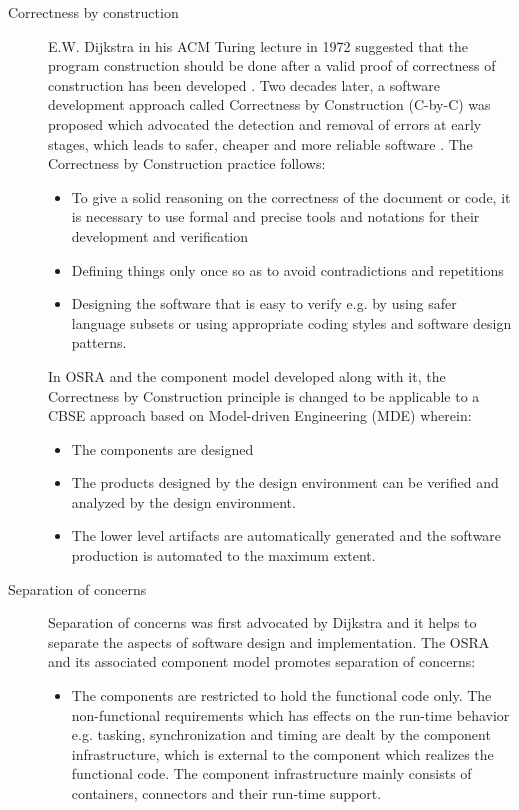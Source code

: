 \begin{description}
\item[Correctness by construction] E.W. Dijkstra in his ACM Turing lecture in 1972 suggested that the program construction should be done after a valid proof of correctness of construction has been developed \cite{CompBasedProcess}. Two decades later, a software development approach called Correctness by Construction (C-by-C) was proposed which advocated the detection and removal of errors at early stages, which leads to safer, cheaper and more reliable software \cite{CompBasedProcess,PhdThesis}. The Correctness by Construction practice follows:
\begin{itemize}
\item To give a solid reasoning on the correctness of the document or code, it is necessary to use formal and precise tools and notations for their development and verification 
\item Defining things only once so as to avoid contradictions and repetitions
\item Designing the software that is easy to verify e.g. by using safer language subsets or using appropriate coding styles and software design patterns. 
\end{itemize}

In OSRA and the component model developed along with it, the Correctness by Construction principle is changed to be applicable to a CBSE approach based on Model-driven Engineering (MDE) \cite{CompBasedProcess} wherein:

\begin{itemize}
\item The components are designed
\item The products designed by the design environment can be verified and analyzed by the design environment.
\item The lower level artifacts are automatically generated and the software production is automated to the maximum extent.  
\end{itemize}

\item [Separation of concerns] 
\label{section: Founding principle-Separation of concerns} 
Separation of concerns was first advocated by Dijkstra \cite{CompBasedProcess} and it helps to separate the aspects of software design and implementation. The OSRA and its associated component model promotes separation of concerns\cite{CompBasedProcess,PhdThesis}:

\begin{itemize}
\item The components are restricted to hold the functional code only. The non-functional requirements which has effects on the run-time behavior e.g. tasking, synchronization and timing are dealt by the component infrastructure, which is external to the component which realizes the functional code. The component infrastructure mainly consists of containers, connectors and their run-time support.


\end{itemize}
\end{description}

